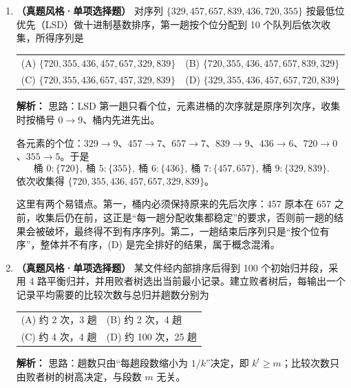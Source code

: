 \begin{enumerate}[start=7]

\item \textbf{（真题风格·单项选择题）} 对序列 $\{329,457,657,839,436,720,355\}$ 按最低位优先（LSD）做十进制基数排序，第一趟按个位分配到 10 个队列后依次收集，所得序列是
\begin{center}
\begin{tabularx}{0.96\linewidth}{@{}XX@{}}
(A) $\{720,355,436,457,657,329,839\}$ & (B) $\{720,355,436,457,657,839,329\}$ \\[4pt]
(C) $\{720,355,436,657,457,329,839\}$ & (D) $\{329,355,436,457,657,720,839\}$
\end{tabularx}
\end{center}

\ifshowsolutions\par\noindent\textbf{解析：} 思路：LSD 第一趟只看个位，元素进桶的次序就是原序列次序，收集时按桶号 $0\to9$、桶内先进先出。

各元素的个位：$329\to9$、$457\to7$、$657\to7$、$839\to9$、$436\to6$、$720\to0$、$355\to5$。于是
\[
\text{桶 }0:\{720\},\ \text{桶 }5:\{355\},\ \text{桶 }6:\{436\},\
\text{桶 }7:\{457,657\},\ \text{桶 }9:\{329,839\}.
\]
依次收集得 $\{720,355,436,457,657,329,839\}$。

这里有两个易错点。第一，桶内必须保持原来的先后次序：457 原本在 657 之前，收集后仍在前，这正是“每一趟分配收集都稳定”的要求，否则前一趟的结果会被破坏，最终得不到有序序列。第二，一趟结束后序列只是“按个位有序”，整体并不有序，(D) 是完全排好的结果，属于概念混淆。

\else \answerarea \fi

\item \textbf{（真题风格·单项选择题）} 某文件经内部排序后得到 100 个初始归并段，采用 4 路平衡归并，并用败者树选出当前最小记录。建立败者树后，每输出一个记录平均需要的比较次数与总归并趟数分别为
\begin{center}
\begin{tabularx}{0.96\linewidth}{@{}XX@{}}
(A) 约 2 次，3 趟 & (B) 约 2 次，4 趟 \\[4pt]
(C) 约 4 次，4 趟 & (D) 约 100 次，25 趟
\end{tabularx}
\end{center}

\ifshowsolutions\par\noindent\textbf{解析：} 思路：趟数只由“每趟段数缩小为 $1/k$”决定，即 $k^t\geqslant m$；比较次数只由败者树的树高决定，与段数 $m$ 无关。


\end{enumerate}
